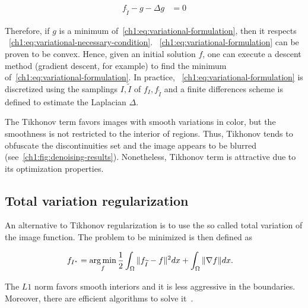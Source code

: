 \begin{align}
	f_{\widetilde{I}} - g - \Delta g &= 0
	\label{ch1:eq:variational-necessary-condition}
\end{align}


Therefore, if $g$ is a minimum of~\cref{ch1:eq:variational-formulation}, then it respects ~\cref{ch1:eq:variational-necessary-condition}. ~\cref{ch1:eq:variational-formulation} can be proven to be convex. Hence, given an initial solution $f$, one can execute a descent method (gradient descent, for example) to find the minimum of~\cref{ch1:eq:variational-formulation}. In practice, ~\cref{ch1:eq:variational-formulation} is discretized using the samplings $I,\widetilde{I}$ of $f_I,f_{\widetilde{I}}$ and a finite differences scheme is defined to estimate the Laplacian $\Delta$.

The Tikhonov term favors images with smooth variations in color, but the smoothness is not restricted to the interior of regions. Thus, Tikhonov tends to obfuscate the discontinuities set and the image appears to be blurred (see~\cref{ch1:fig:denoising-results}). Nonetheless, Tikhonov term is attractive due to its optimization properties.


\subsection{Total variation regularization}
An alternative to Tikhonov regularization is to use the so called total variation of the image function. The problem to be minimized is then defined as

\begin{align}
	f_{I^{\star}} &= \operatorname*{arg\,min}_{f} \frac{1}{2} \int_{\Omega}{ \lVert f_{\widetilde{I}} - f\rVert^2dx} + \int_{\Omega}{ \lVert\nabla f\rVert dx}.
\end{align}

The $L1$ norm favors smooth interiors and it is less aggressive in the boundaries. Moreover, there are efficient algorithms to solve it~\cite{rudin92,chambolle04,beck09}.

